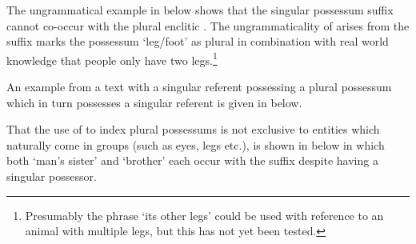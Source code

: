 The ungrammatical example in  below
shows that the singular possessum suffix  cannot
co-occur with the plural enclitic .
The ungrammaticality of 
arises from the suffix  marks the possessum 
`leg/foot' as plural in combination with real world knowledge
that people only have two legs.\footnote{
		Presumably the phrase  `its other legs'
		could be used with reference to an animal with multiple legs,
		but this has not yet been tested.}

\begin{exe}
	\label{ex:*hin maatn iin}
	\label{ex:*hiin haer bian=ee}
\end{exe}

An example from a text with a singular referent
possessing a plural possessum which in turn
possesses a singular referent is given in  below.

\newpage
\begin{exe}
	\label{ex:RO-170822-3, 2.12}
\end{exe}

That the use of  to index plural possessums
is not exclusive to entities which naturally come in
groups (such as eyes, legs etc.), is shown in  below
in which both  `man's sister' and  `brother'
each occur with the suffix  despite having a singular possessor.

\begin{exe}
	\label{ex:RO-170917-1, 8.06-8.11}
\end{exe}

